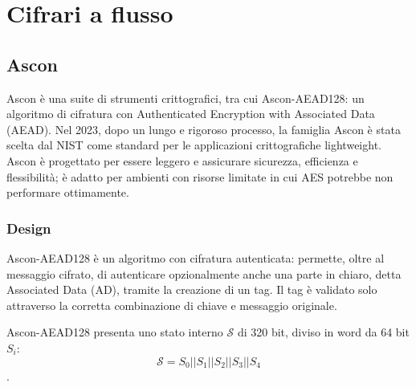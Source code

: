 \documentclass[target=bach,aauheader=,style=]{thud}
\begin{document}
	\section{Cifrari a flusso}
		\subsection{Ascon\cite{ascon}}
		Ascon è una suite di strumenti crittografici, tra cui Ascon-AEAD128: un algoritmo di cifratura con Authenticated Encryption with Associated Data (AEAD). Nel 2023, dopo un lungo e rigoroso processo, la famiglia Ascon è stata scelta dal NIST come standard per le applicazioni crittografiche lightweight.\\
		Ascon è progettato per essere leggero e assicurare sicurezza, efficienza e flessibilità; è adatto per ambienti con risorse limitate in cui AES potrebbe non performare ottimamente\cite{ascon}.
			\subsubsection{Design}
			Ascon-AEAD128 è un algoritmo con cifratura autenticata: permette, oltre al messaggio cifrato, di autenticare opzionalmente anche una parte in chiaro, detta Associated Data (AD), tramite la creazione di un tag. Il tag è validato solo attraverso la corretta combinazione di chiave e messaggio originale.
			
			Ascon-AEAD128 presenta uno stato interno $\mathcal{S}$ di 320 bit, diviso in word da 64 bit $S_i$:
			\[\mathcal{S} = S_0 || S_1 || S_2 || S_3 || S_4\].
			
\end{document}

